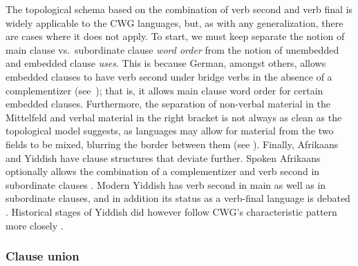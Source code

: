 \documentclass[output=paper,hidelinks]{langscibook}
\begin{document}
The topological schema based on the combination of verb second and
verb final is widely applicable to the CWG languages, but, as with any
generalization, there are cases where it does not apply. To start, we
must keep separate the notion of main clause vs.\ subordinate clause
\textit{word order} from the notion of unembedded and embedded clause
\textit{uses}. This is because German, amongst others, allows embedded
clauses to have verb second under bridge verbs in the absence of a
complementizer (see~); that is, it allows main clause
word order for certain embedded clauses. Furthermore, the separation
of non-verbal material in the Mittelfeld and verbal material in
the right bracket is not always as clean as the topological model
suggests, as languages may allow for material from the two fields to
be mixed, blurring the border between them (see
). Finally, Afrikaans and Yiddish have clause
structures that deviate further. Spoken Afrikaans optionally allows
the combination of a complementizer and verb second in subordinate
clauses \citep{biberauer:2009}. Modern Yiddish has verb second in main
as well as in subordinate clauses, and in addition its status as a
verb-final language is debated \citep{diesing:1997}. Historical stages
of Yiddish did however follow CWG's characteristic pattern more
closely \citep{santorini:1992}.

\subsubsection{Clause union}
\end{document}
